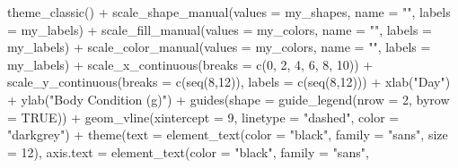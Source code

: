 \documentclass[
]{article}
\newenvironment{Shaded}{\begin{snugshade}}{\end{snugshade}}
\newcommand{\AttributeTok}[1]{\textcolor[rgb]{0.77,0.63,0.00}{#1}}
\newcommand{\ConstantTok}[1]{\textcolor[rgb]{0.00,0.00,0.00}{#1}}
\newcommand{\DecValTok}[1]{\textcolor[rgb]{0.00,0.00,0.81}{#1}}
\newcommand{\FunctionTok}[1]{\textcolor[rgb]{0.00,0.00,0.00}{#1}}
\newcommand{\NormalTok}[1]{#1}
\newcommand{\SpecialCharTok}[1]{\textcolor[rgb]{0.00,0.00,0.00}{#1}}
\newcommand{\StringTok}[1]{\textcolor[rgb]{0.31,0.60,0.02}{#1}}
\begin{document}
\begin{Shaded}
\begin{Highlighting}[]
  \FunctionTok{theme\_classic}\NormalTok{() }\SpecialCharTok{+} 
  \FunctionTok{scale\_shape\_manual}\NormalTok{(}\AttributeTok{values =}\NormalTok{ my\_shapes, }\AttributeTok{name =} \StringTok{""}\NormalTok{,}
                     \AttributeTok{labels =}\NormalTok{ my\_labels) }\SpecialCharTok{+}
  \FunctionTok{scale\_fill\_manual}\NormalTok{(}\AttributeTok{values =}\NormalTok{ my\_colors, }\AttributeTok{name =} \StringTok{""}\NormalTok{,}
                     \AttributeTok{labels =}\NormalTok{ my\_labels) }\SpecialCharTok{+}
  \FunctionTok{scale\_color\_manual}\NormalTok{(}\AttributeTok{values =}\NormalTok{ my\_colors, }\AttributeTok{name =} \StringTok{""}\NormalTok{,}
                     \AttributeTok{labels =}\NormalTok{ my\_labels) }\SpecialCharTok{+}
  \FunctionTok{scale\_x\_continuous}\NormalTok{(}\AttributeTok{breaks =} \FunctionTok{c}\NormalTok{(}\DecValTok{0}\NormalTok{, }\DecValTok{2}\NormalTok{, }\DecValTok{4}\NormalTok{, }\DecValTok{6}\NormalTok{, }\DecValTok{8}\NormalTok{, }\DecValTok{10}\NormalTok{)) }\SpecialCharTok{+}
  \FunctionTok{scale\_y\_continuous}\NormalTok{(}\AttributeTok{breaks =} \FunctionTok{c}\NormalTok{(}\FunctionTok{seq}\NormalTok{(}\DecValTok{8}\NormalTok{,}\DecValTok{12}\NormalTok{)),}
                     \AttributeTok{labels =} \FunctionTok{c}\NormalTok{(}\FunctionTok{seq}\NormalTok{(}\DecValTok{8}\NormalTok{,}\DecValTok{12}\NormalTok{))) }\SpecialCharTok{+}
  \FunctionTok{xlab}\NormalTok{(}\StringTok{"Day"}\NormalTok{) }\SpecialCharTok{+} 
  \FunctionTok{ylab}\NormalTok{(}\StringTok{"Body Condition (g\textquotesingle{})"}\NormalTok{) }\SpecialCharTok{+} 
  \FunctionTok{guides}\NormalTok{(}\AttributeTok{shape =} \FunctionTok{guide\_legend}\NormalTok{(}\AttributeTok{nrow =} \DecValTok{2}\NormalTok{, }\AttributeTok{byrow =} \ConstantTok{TRUE}\NormalTok{)) }\SpecialCharTok{+}
  \FunctionTok{geom\_vline}\NormalTok{(}\AttributeTok{xintercept =} \DecValTok{9}\NormalTok{,}
             \AttributeTok{linetype =} \StringTok{"dashed"}\NormalTok{,}
             \AttributeTok{color =} \StringTok{"darkgrey"}\NormalTok{) }\SpecialCharTok{+}
  \FunctionTok{theme}\NormalTok{(}\AttributeTok{text =} \FunctionTok{element\_text}\NormalTok{(}\AttributeTok{color =} \StringTok{"black"}\NormalTok{, }
                            \AttributeTok{family =} \StringTok{"sans"}\NormalTok{, }
                            \AttributeTok{size =} \DecValTok{12}\NormalTok{),}
        \AttributeTok{axis.text =} \FunctionTok{element\_text}\NormalTok{(}\AttributeTok{color =} \StringTok{"black"}\NormalTok{, }
                                 \AttributeTok{family =} \StringTok{"sans"}\NormalTok{, }

\end{Highlighting}
\end{Shaded}
\end{document}

